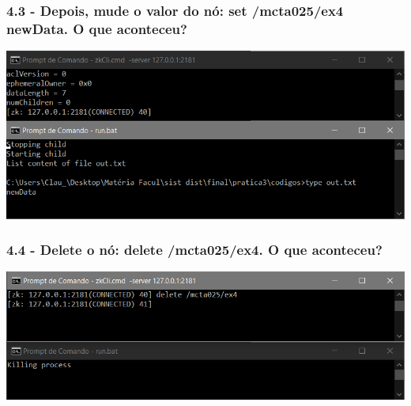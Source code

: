 \subsubsection{4.3 - Depois, mude o valor do nó: set /mcta025/ex4 newData. O que
aconteceu?}
\includegraphics{pratica3/prints/roteiro 4.3.PNG}

\subsubsection{4.4 - Delete o nó: delete /mcta025/ex4. O que aconteceu?}
\includegraphics{pratica3/prints/roteiro 4.4.PNG}
